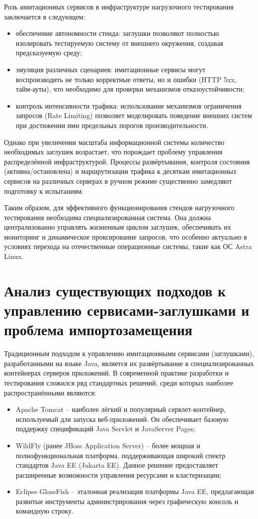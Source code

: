 Роль имитационных сервисов в инфраструктуре нагрузочного тестирования заключается в следующем:

\begin{itemize}
\item обеспечение автономности стенда: заглушки позволяют полностью изолировать тестируемую систему от внешнего окружения, создавая предсказуемую среду;
\item эмуляция различных сценариев: имитационные сервисы могут воспроизводить не только корректные ответы, но и ошибки (HTTP 5xx, тайм-ауты), что необходимо для проверки механизмов отказоустойчивости;
\item контроль интенсивности трафика: использование механизмов ограничения запросов (Rate Limiting) позволяет моделировать поведение внешних систем при достижении ими предельных порогов производительности.
\end{itemize}

Однако при увеличении масштаба информационной системы количество необходимых заглушек возрастает, что порождает проблему управления распределённой инфраструктурой. Процессы развёртывания, контроля состояния (активна/остановлена) и маршрутизации трафика к десяткам имитационных сервисов на различных серверах в ручном режиме существенно замедляют подготовку к испытаниям.

Таким образом, для эффективного функционирования стендов нагрузочного тестирования необходима специализированная система. Она должна централизованно управлять жизненным циклом заглушек, обеспечивать их мониторинг и динамическое проксирование запросов, что особенно актуально в условиях перехода на отечественные операционные системы, такие как ОС Astra Linux.

\section{Анализ существующих подходов к управлению сервисами-заглушками и проблема импортозамещения}

Традиционным подходом к управлению имитационными сервисами (заглушками), разработанными на языке Java, является их развёртывание в специализированных контейнерах серверов приложений. В современной практике разработки и тестирования сложился ряд стандартных решений, среди которых наиболее распространёнными являются:

\begin{itemize}
\item Apache Tomcat -- наиболее лёгкий и популярный сервлет-контейнер, используемый для запуска веб-приложений. Он обеспечивает базовую поддержку спецификаций Java Servlet и JavaServer Pages;
\item WildFly (ранее JBoss Application Server) -- более мощная и полнофункциональная платформа, поддерживающая широкий спектр стандартов Java EE (Jakarta EE). Данное решение предоставляет расширенные возможности управления ресурсами и кластеризации;
\item Eclipse GlassFish -- эталонная реализация платформы Java EE, предлагающая развитые инструменты администрирования через графическую консоль и командную строку.
\end{itemize}

